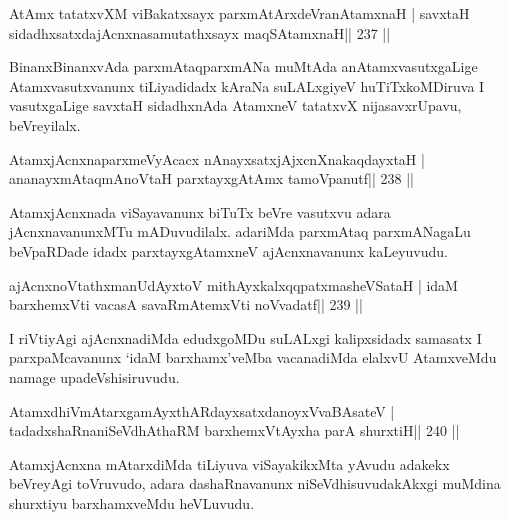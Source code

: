 
\begin{shl}
AtAmx tatatxvXM viBakatxsayx parxmAtArxdeVranAtamxnaH |
savxtaH sidadhxsatxdajAcnxnasamutathxsayx maqSAtamxnaH\hfill || 237 ||
\end{shl}

\begin{artha}
BinanxBinanxvAda parxmAtaqparxmANa muMtAda anAtamxvasutxgaLige Atamxvasutxvanunx tiLiyadidadx kAraNa suLALxgiyeV huTiTxkoMDiruva I vasutxgaLige savxtaH sidadhxnAda AtamxneV tatatxvX nijasavxrUpavu, beVreyilalx.
\end{artha}

\begin{shl}
AtamxjAcnxnaparxmeVyAcacx nAnayxsatxjAjxcnXnakaqdayxtaH |
ananayxmAtaqmAnoV\s taH parxtayxgAtAmx tamoVpanutf\hfill || 238 ||
\end{shl}

\begin{artha}
AtamxjAcnxnada viSayavanunx biTuTx beVre vasutxvu adara jAcnxnavanunxMTu mADuvudilalx. adariMda parxmAtaq parxmANagaLu beVpaRDade idadx parxtayxgAtamxneV ajAcnxnavanunx kaLeyuvudu.
\end{artha}

\begin{shl}
ajAcnxnoVtathxmanUdAyxtoV mithAyxkalxqqpatxmasheVSataH |
idaM barxhemxVti vacasA savaRmAtemxVti noV\s vadatf\hfill || 239 ||
\end{shl}

\begin{artha}
I riVtiyAgi ajAcnxnadiMda edudxgoMDu suLALxgi kalipxsidadx samasatx I parxpaMcavanunx `idaM barxhamx'veMba vacanadiMda elalxvU AtamxveMdu namage upadeVshisiruvudu.
\end{artha}


\begin{shl}
AtamxdhiVmAtarxgamAyxthARdayxsatxdanoyxV\s vaBAsateV |
tadadxshaRnaniSeVdhAthaRM barxhemxVtAyxha parA shurxtiH\hfill || 240 ||
\end{shl}

\begin{artha}
AtamxjAcnxna mAtarxdiMda tiLiyuva viSayakikxMta yAvudu adakekx beVreyAgi toVruvudo, adara dashaRnavanunx niSeVdhisuvudakAkxgi muMdina shurxtiyu barxhamxveMdu heVLuvudu.
\end{artha}

